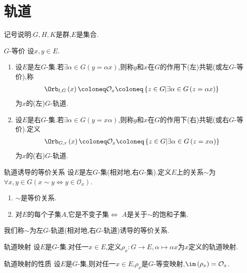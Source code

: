 \section{轨道}

记号说明:$G,H,K$是群,$E$是集合.

\begin{definition}{$G$-等价}{}
	设$x,y\in E$.
	\begin{enumerate}
		\item 设$E$是左$G$-集.若$\exists\alpha\in G\left(y=\alpha x\right)$,则称$y$和$x$在$G$的作用下(左)共轭(或左$G$-等价),称
		\begin{align*}
			\Orb_{l,G}\left(x\right)\coloneq\mathcal{O}_{x}\coloneq\left\{z\in G\middle|\exists\alpha\in G\left(z=\alpha x\right)\right\}
		\end{align*}
		为$x$的(左)$G$-轨道.
		\item 设$E$是右$G$-集.若$\exists\alpha\in G\left(y=x \alpha\right)$,则称$y$和$x$在$G$的作用下(右)共轭(或右$G$-等价).定义
		\begin{align*}
			\Orb_{G,r}\left(x\right)\coloneq\mathcal{O}_{x}\coloneq\left\{z\in G\middle|\exists\alpha\in G\left(z=x \alpha\right)\right\}
		\end{align*}
		为$x$的(右)$G$-轨道.
	\end{enumerate}
\end{definition}

\begin{proposition}{轨道诱导的等价关系}{}
	设$E$是左$G$-集(相对地,右$G$-集).定义$E$上的关系$\sim$为$\forall x,y\in G\left(x\sim y\iff y\in\mathcal{O}_{x}\right)$.
	\begin{enumerate}
		\item $\sim$是等价关系.
		\item 对$E$的每个子集$A$,它是不变子集$\iff$ $A$是关于$\sim$的饱和子集.
	\end{enumerate}
	我们称$\sim$为左$G$-轨道(相对地,右$G$-轨道)诱导的等价关系.
\end{proposition}

\begin{definition}{轨道映射}{}
	设$E$是$G$-集.对任一$x\in E$,定义$\rho_{x}:G\to E,\alpha\mapsto\alpha x$为$x$定义的轨道映射.
\end{definition}

\begin{proposition}{轨道映射的性质}{}
	设$E$是$G$-集,则对任一$x\in E$,$\rho_{x}$是$G$-等变映射,$\im\left(\rho_{x}\right)=\mathcal{O}_{x}$.
\end{proposition}

